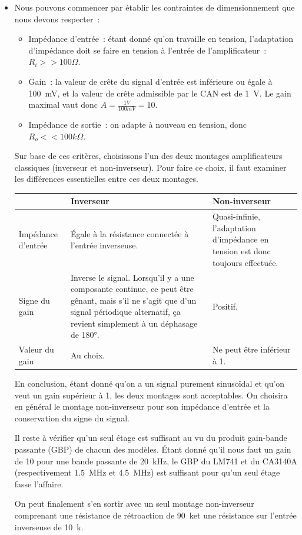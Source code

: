 \documentclass{../template/tp}
\begin{document}
{
	\begin{itemize}
		\item Nous pouvons commencer par établir les contraintes de dimensionnement que nous devons respecter~:
		\begin{itemize}
			\item Impédance d'entrée~: étant donné qu'on travaille en tension, l'adaptation d'impédance doit se faire en tension à l'entrée de l'amplificateur~: $R_i >> 100 \Omega$.
			\item Gain~: la valeur de crête du signal d'entrée est inférieure ou égale à 100~mV, et la valeur de crête admissible par le CAN est de 1~V. Le gain maximal vaut donc $A = \frac{1V}{100mV} = 10$.
			\item Impédance de sortie~: on adapte à nouveau en tension, donc $R_o << 100 k\Omega$.
		\end{itemize}

		Sur base de ces critères, choisissons l'un des deux montages amplificateurs classiques (inverseur et non-inverseur).
		Pour faire ce choix, il faut examiner les différences essentielles entre ces deux montages.\\

		\begin{center}
			\begin{tabularx}{.9\textwidth}{l|X|X}
			& Inverseur & Non-inverseur \\ \hline
			Impédance d'entrée & Égale à la résistance connectée à l'entrée inverseuse. & Quasi-infinie, l'adaptation d'impédance en tension est donc toujours effectuée. \\ \hline
			Signe du gain & Inverse le signal. Lorsqu'il y a une composante continue, ce peut être gênant, mais s'il ne s'agit que d'un signal périodique alternatif, ça revient simplement à un déphasage de 180°. & Positif. \\ \hline
			Valeur du gain & Au choix. & Ne peut être inférieur à 1. \\
			\end{tabularx}
		\end{center}

		En conclusion, étant donné qu'on a un signal purement sinusoïdal et qu'on veut un gain supérieur à 1, les deux montages sont acceptables.
		On choisira en général le montage non-inverseur pour son impédance d'entrée et la conservation du signe du signal.

		Il reste à vérifier qu'un seul étage est suffisant au vu du produit gain-bande passante (GBP) de chacun des modèles.
		Étant donné qu'il nous faut un gain de 10 pour une bande passante de 20~kHz, le GBP du LM741 et du CA3140A (respectivement 1.5~MHz et 4.5~MHz) est suffisant pour qu'un seul étage fasse l'affaire.

		On peut finalement s'en sortir avec un seul montage non-inverseur comprenant une résistance de rétroaction de 90~k\ohm et une résistance sur l'entrée inverseuse de 10~k\ohm.
	\end{itemize}
}
\end{document}

